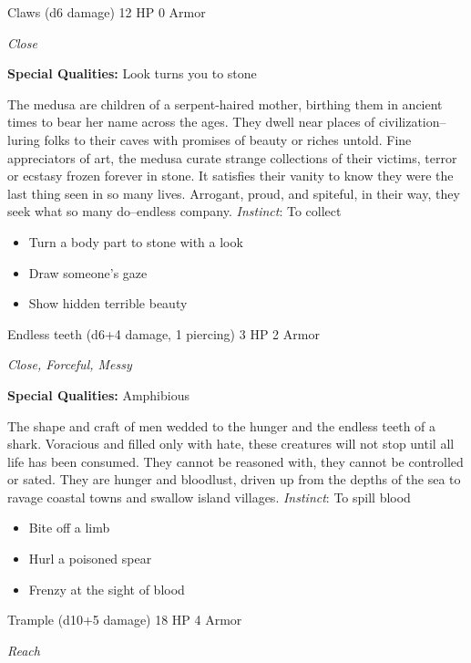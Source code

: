 Claws (d6 damage)\hspace*{\fill} 12 HP 0 Armor

\emph{Close}

\textbf{Special Qualities:}
Look turns you to stone

\HRule
The medusa are children of a serpent-haired mother, birthing them in ancient times to bear her name across the ages. They dwell near places of civilization--luring folks to their caves with promises of beauty or riches untold. Fine appreciators of art, the medusa curate strange collections of their victims, terror or ecstasy frozen forever in stone. It satisfies their vanity to know they were the last thing seen in so many lives. Arrogant, proud, and spiteful, in their way, they seek what so many do--endless company. \emph{Instinct}: To collect
\begin{itemize}
\item Turn a body part to stone with a look
\item Draw someone's gaze
\item Show hidden terrible beauty
\end{itemize}

\HRule
{}

Endless teeth (d6+4 damage, 1 piercing)\hspace*{\fill} 3 HP 2 Armor

\emph{Close, Forceful, Messy}

\textbf{Special Qualities:}
Amphibious

\HRule
The shape and craft of men wedded to the hunger and the endless teeth of a shark. Voracious and filled only with hate, these creatures will not stop until all life has been consumed. They cannot be reasoned with, they cannot be controlled or sated. They are hunger and bloodlust, driven up from the depths of the sea to ravage coastal towns and swallow island villages. \emph{Instinct}: To spill blood
\begin{itemize}
\item Bite off a limb
\item Hurl a poisoned spear
\item Frenzy at the sight of blood
\end{itemize}
\newpage
\HRule
{}

Trample (d10+5 damage)\hspace*{\fill} 18 HP 4 Armor

\emph{Reach}

